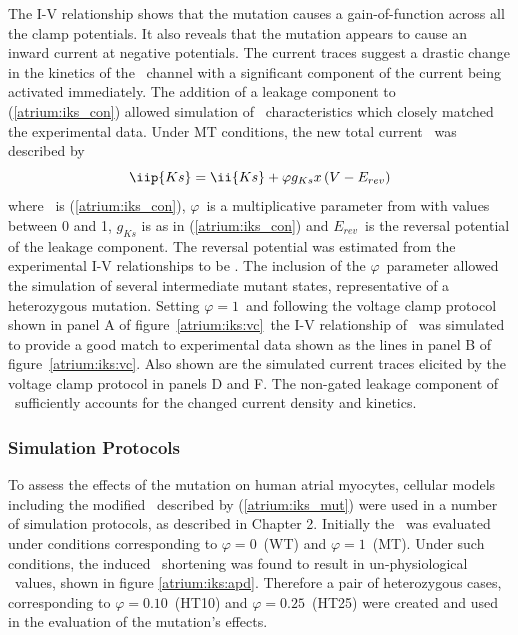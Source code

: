 The I-V relationship shows that the mutation causes a gain-of-function across
all the clamp potentials.
It also reveals that the mutation appears to cause an inward current at negative
potentials.
The current traces suggest a drastic change in the kinetics of the \
channel with a significant component of the current being activated immediately.
The addition of a leakage component to (\ref{atrium:iks_con}) allowed simulation
of \ii{Ks}\ characteristics which closely matched the experimental data.
Under MT conditions, the new total current \iip{Ks}\ was described by
\begin{equation}
\label{atrium:iks_mut}
\iip{Ks} = \ii{Ks} + \varphi g_{Ks}x\left(V-E_{rev}\right)
\end{equation}
where \ is (\ref{atrium:iks_con}), $\varphi$\ is a multiplicative parameter
from with values between 0 and 1, $g_{Ks}$ is as in (\ref{atrium:iks_con}) and
$E_{rev}$\ is the reversal potential of the leakage component.
The reversal potential was estimated from the experimental I-V relationships to be
\mv{-76.3}.
The inclusion of the $\varphi$\ parameter allowed the simulation of several
intermediate mutant states, representative of a heterozygous mutation.
Setting $\varphi = 1$\ and following the voltage clamp protocol shown in panel A
of figure~\ref{atrium:iks:vc}\ the I-V relationship of \ii{Ks}\ was simulated to
provide a good match to experimental data shown as the lines in panel B of
figure~\ref{atrium:iks:vc}.
Also shown are the simulated current traces elicited by the voltage clamp
protocol in panels D and F.
The non-gated leakage component of \ sufficiently accounts for the
changed current density and kinetics.

\subsubsection{Simulation Protocols}
\label{sec:atrium:s140g:methods}
To assess the effects of the mutation on human atrial myocytes, cellular models
including the modified \iip{Ks}\ described by (\ref{atrium:iks_mut}) were used
in a number of simulation protocols, as described in Chapter 2.
Initially the \apd\ was evaluated under conditions corresponding to $\varphi =
0$\ (WT) and $\varphi = 1$\ (MT).
Under such conditions, the induced \apd\ shortening was found to result in
un-physiological \apd\ values, shown in figure \ref{atrium:iks:apd}.
Therefore a pair of heterozygous cases, corresponding to $\varphi = 0.10$\
(HT10) and $\varphi = 0.25$\ (HT25) were created and used in the evaluation of
the mutation's effects.

